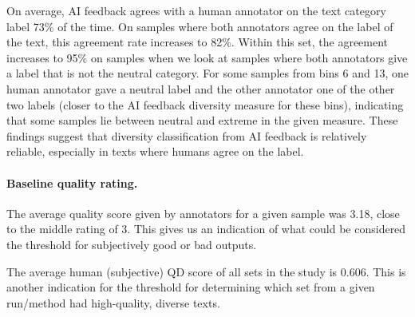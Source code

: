 On average, AI feedback agrees with a human annotator on the text category label 73\% of the time. On samples where both annotators agree on the label of the text, this agreement rate increases to 82\%. Within this set, the agreement increases to 95\% on samples when we look at samples where both annotators give a label that is not the neutral category. For some samples from bins 6 and 13, one human annotator gave a neutral label and the other annotator one of the other two labels (closer to the AI feedback diversity measure for these bins), indicating that some samples lie between neutral and extreme in the given measure. These findings suggest that diversity classification from AI feedback is relatively reliable, especially in texts where humans agree on the label.

\paragraph{Baseline quality rating.}
The average quality score given by annotators for a given sample was 3.18, close to the middle rating of 3. This gives us an indication of what could be considered the threshold for subjectively good or bad outputs.

The average human (subjective) QD score of all sets in the study is 0.606. This is another indication for the threshold for determining which set from a given run/method had high-quality, diverse texts.

